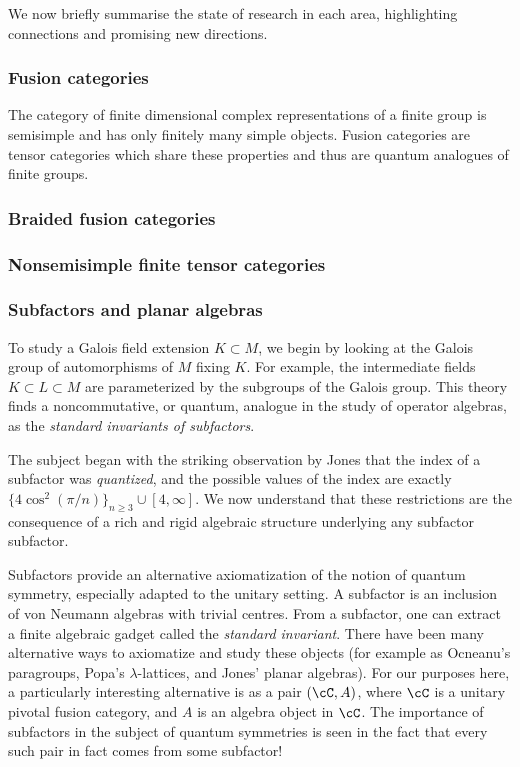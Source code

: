 \documentclass[11pt]{article}
\begin{document}
We now briefly summarise the state of research in each area, highlighting connections and promising new directions.

\subsubsection{Fusion categories}
The category of finite dimensional complex representations of a finite group is semisimple and has only finitely many simple objects.  Fusion categories are tensor categories which share these properties and thus are quantum analogues of finite groups.



\subsubsection{Braided fusion categories}


\subsubsection{Nonsemisimple finite tensor categories}

\subsubsection{Subfactors and planar algebras}
To study a Galois field extension $K \subset M$, we begin by looking at the
Galois group of automorphisms of $M$ fixing $K$. For example, the intermediate
fields $K \subset L \subset M$ are parameterized by the subgroups of the
Galois group. This theory finds a noncommutative, or quantum, analogue in the
study of operator algebras, as the \emph{standard invariants of subfactors}.

The subject began with the striking observation by Jones that the index of a
subfactor was \emph{quantized}, and the possible values of the index are
exactly $\{4 \cos^2(\pi/n)\}_{n \geq 3} \cup [4,\infty]$. We now understand
that these restrictions are the consequence of a rich and rigid algebraic
structure underlying any subfactor subfactor.

Subfactors provide an alternative axiomatization of the notion of quantum
symmetry, especially adapted to the unitary setting. A subfactor is an
inclusion of von Neumann algebras with trivial centres. From a subfactor, one
can extract a finite algebraic gadget called the \emph{standard invariant}.
There have been many alternative ways to axiomatize and study these objects
(for example as Ocneanu's paragroups, Popa's $\lambda$-lattices, and Jones'
planar algebras). For our purposes here, a particularly interesting
alternative is as a pair $(\cC, A)$, where $\cC$ is a unitary pivotal fusion
category, and $A$ is an algebra object in $\cC$. The importance of subfactors
in the subject of quantum symmetries is seen in the fact that every such pair
in fact comes from some subfactor!
\end{document}
